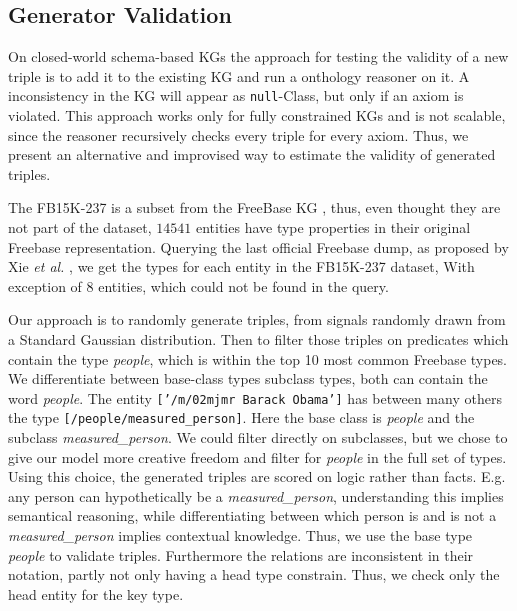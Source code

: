 


\subsection{Generator Validation}
\label{ssec5:syntax}

On closed-world schema-based KGs the approach for testing the validity of a new triple is to add it to the existing KG and run a onthology reasoner on it. A inconsistency in the KG will appear as \texttt{null}-Class, but only if an axiom is violated. This approach works only for fully constrained KGs and is not scalable, since the reasoner recursively checks every triple for every axiom. Thus, we present an alternative and improvised way to estimate the validity of generated triples.

The FB15K-237 is a subset from the FreeBase KG \cite{bollacker_freebase_2008}, thus, even thought they are not part of the dataset, $14541$ entities have type properties in their original Freebase representation. 
Querying the last official Freebase dump, as proposed by Xie \textit{et al.} \cite{xie2016representation}, we get the types for each entity in the FB15K-237 dataset, With exception of $8$ entities, which could not be found in the query.

Our approach is to randomly generate triples, from signals randomly drawn from a Standard Gaussian distribution. Then to filter those triples on predicates which contain the type \textit{people}, which is within the top 10 most common Freebase types. We differentiate between base-class types subclass types, both can contain the word \textit{people}. The entity \texttt{['/m/02mjmr Barack Obama']} has between many others the type \texttt{[/people/measured\_person]}. Here the base class is \textit{people} and the subclass \textit{measured\_person}. We could filter directly on subclasses, but we chose to give our model more creative freedom and filter for \textit{people} in the full set of types. Using this choice, the generated triples are scored on logic rather than facts. E.g. any person can hypothetically be a \textit{measured\_person}, understanding this implies semantical reasoning, while differentiating between which person is and is not a \textit{measured\_person} implies contextual knowledge. Thus, we use the base type \textit{people} to validate triples.
Furthermore the relations are inconsistent in their notation, partly not only having a head type constrain. Thus, we check only the head entity for the key type. 

